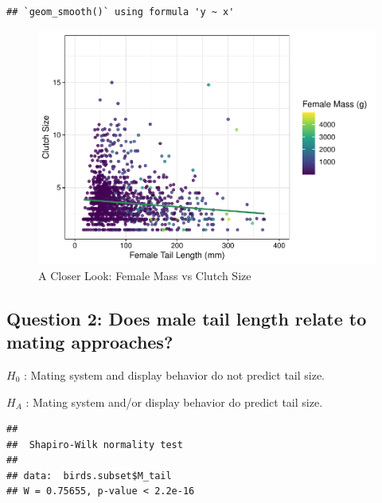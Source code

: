 \documentclass[
  12pt,
]{article}
\newenvironment{Shaded}{\begin{snugshade}}{\end{snugshade}}
\newcommand{\CommentTok}[1]{\textcolor[rgb]{0.56,0.35,0.01}{\textit{#1}}}
\newcommand{\FunctionTok}[1]{\textcolor[rgb]{0.00,0.00,0.00}{#1}}
\newcommand{\NormalTok}[1]{#1}
\newcommand{\SpecialCharTok}[1]{\textcolor[rgb]{0.00,0.00,0.00}{#1}}
\begin{document}
\begin{verbatim}
## `geom_smooth()` using formula 'y ~ x'
\end{verbatim}

\begin{figure}
\centering
\includegraphics{Project_Code_files/figure-latex/q-1 plot zoom-1.pdf}
\caption{A Closer Look: Female Mass vs Clutch Size}
\end{figure}

\newpage

\hypertarget{question-2-does-male-tail-length-relate-to-mating-approaches}{%
\subsection{Question 2: Does male tail length relate to mating
approaches?}\label{question-2-does-male-tail-length-relate-to-mating-approaches}}

\(H_0\) : Mating system and display behavior do not predict tail size.

\(H_A\) : Mating system and/or display behavior do predict tail size.

\begin{Shaded}
\end{Shaded}

\begin{verbatim}
## 
##  Shapiro-Wilk normality test
## 
## data:  birds.subset$M_tail
## W = 0.75655, p-value < 2.2e-16
\end{verbatim}
\end{document}
